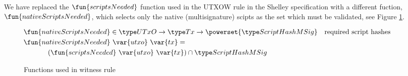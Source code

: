 We have replaced the $\fun{scriptsNeeded}$ function used in the UTXOW rule
in the Shelley specification
with a different fuction, $\fun{nativeScriptsNeeded}$, which selects only
the native (multisignature) scipts as the set which must be validated, see Figure
\ref{fig:functions-witnesses}.


\begin{figure}[htb]
  \begin{align*}
    & \hspace{-1cm}\fun{nativeScriptsNeeded} \in \UTxO \to \Tx \to
      \powerset{\ScriptHashMSig}
    & \text{required script hashes} \\
    &  \hspace{-1cm}\fun{nativeScriptsNeeded}~\var{utxo}~\var{tx} = \\
    & ~~(\fun{scriptsNeeded}~\var{utxo}~\var{tx}) \cap \ScriptHashMSig
  \end{align*}
  \caption{Functions used in witness rule}
  \label{fig:functions-witnesses}
\end{figure}

\clearpage
